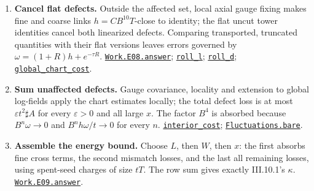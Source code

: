 \documentclass[
  letterpaper,
  11pt]{article}
\begin{document}
\begin{enumerate}
  \href{https://github.com/yang-mills-group/OpenAI-YM-20261028/blob/3456e5e75cf8d4cd558955a5c7638fba2d68f464/YM/Work/E06.lean\#L413-L440}{\texttt{Work.E06.answer}};
  \href{https://github.com/yang-mills-group/OpenAI-YM-20261028/blob/3456e5e75cf8d4cd558955a5c7638fba2d68f464/YM/Work/E07.lean\#L115-L158}{\texttt{Work.E07.answer}}.
\item
  \textbf{Cancel flat defects.} Outside the affected set, local axial
  gauge fixing makes fine and coarse links \(h=CB^{10}T\)-close to
  identity; the flat uncut tower identities cancel both linearized
  defects. Comparing transported, truncated quantities with their flat
  versions leaves errors governed by \(\omega=(1+R)h+e^{-\tau R}\).
  \href{https://github.com/yang-mills-group/OpenAI-YM-20261028/blob/3456e5e75cf8d4cd558955a5c7638fba2d68f464/YM/Work/E08.lean\#L342-L344}{\texttt{Work.E08.answer}};
  \href{https://github.com/yang-mills-group/OpenAI-YM-20261028/blob/3456e5e75cf8d4cd558955a5c7638fba2d68f464/YM/Next/FLUCTUATIONS/Linear.lean\#L89-L136}{\texttt{roll\_l}};
  \href{https://github.com/yang-mills-group/OpenAI-YM-20261028/blob/3456e5e75cf8d4cd558955a5c7638fba2d68f464/YM/Next/FLUCTUATIONS/Linear.lean\#L69-L87}{\texttt{roll\_d}};
  \href{https://github.com/yang-mills-group/OpenAI-YM-20261028/blob/3456e5e75cf8d4cd558955a5c7638fba2d68f464/YM/Next/FLUCTUATIONS/Global.lean\#L76-L148}{\texttt{global\_chart\_cost}}.
\item
  \textbf{Sum unaffected defects.} Gauge covariance, locality and
  extension to global log-fields apply the chart estimates locally; the
  total defect loss is at most \(\varepsilon t^2\sharp A\) for every
  \(\varepsilon>0\) and all large \(x\). The factor \(B^4\) is absorbed
  because \(B^n\omega\to0\) and \(B^nh\omega/t\to0\) for every \(n\).
  \href{https://github.com/yang-mills-group/OpenAI-YM-20261028/blob/3456e5e75cf8d4cd558955a5c7638fba2d68f464/YM/Next/FLUCTUATIONS/Interior.lean\#L22-L63}{\texttt{interior\_cost}};
  \href{https://github.com/yang-mills-group/OpenAI-YM-20261028/blob/3456e5e75cf8d4cd558955a5c7638fba2d68f464/YM/Next/FLUCTUATIONS/Bare.lean\#L64-L120}{\texttt{Fluctuations.bare}}.
\item
  \textbf{Assemble the energy bound.} Choose \(L\), then \(W\), then
  \(x\): the first absorbs fine cross terms, the second mismatch losses,
  and the last all remaining losses, using spent-seed charges of size
  \(tT\). The row sum gives exactly III.10.1's \(\kappa\).
  \href{https://github.com/yang-mills-group/OpenAI-YM-20261028/blob/3456e5e75cf8d4cd558955a5c7638fba2d68f464/YM/Work/E09.lean\#L113-L159}{\texttt{Work.E09.answer}}.

\end{enumerate}
\end{document}
